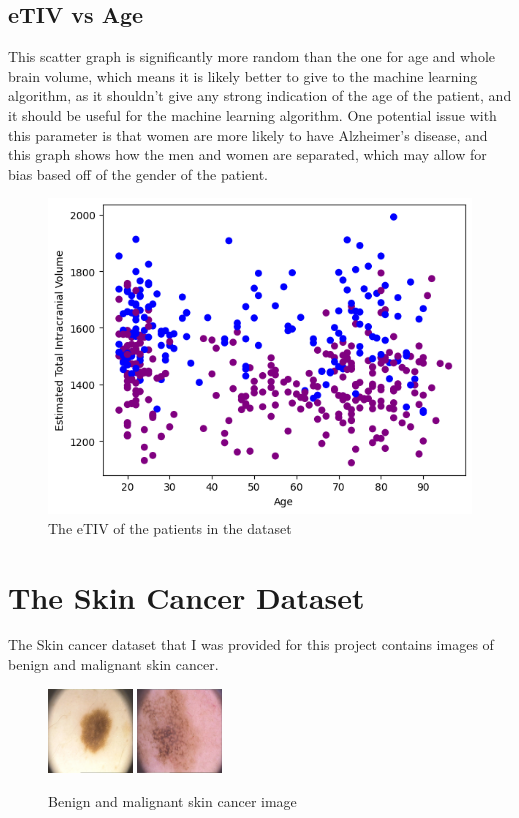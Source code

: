 \documentclass[]{final_report}
\begin{document}
\clearpage
\subsection{eTIV vs Age}
This scatter graph is significantly more random than the one for age and whole brain volume, which means it is likely better to give to the machine learning algorithm, as it shouldn't give any strong indication of the age of the patient, and it should be useful for the machine learning algorithm.
One potential issue with this parameter is that women are more likely to have Alzheimer's disease, and this graph shows how the men and women are separated, which may allow for bias based off of the gender of the patient.
\begin{figure}[h]
  \centering
  \includegraphics[width=1\textwidth]{images/eTIV-vs-Age.png}
  \caption{The eTIV of the patients in the dataset}
  \label{fig:eTIV-vs-Age}
\end{figure}

\clearpage
\section{The Skin Cancer Dataset}
The Skin cancer dataset that I was provided for this project contains images of benign and malignant skin cancer.

\begin{figure}[h]
  \centering
  \includegraphics[width=0.2\textwidth]{images/benign-skin-cancer.png}
  \includegraphics[width=0.2\textwidth]{images/malignant-skin-cancer.png}
  \caption{Benign and malignant skin cancer image}
  \label{fig:benign-malignant}
\end{figure}
\end{document}
